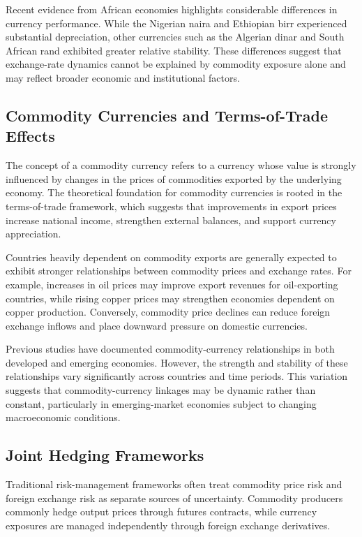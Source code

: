 \documentclass{article}
\begin{document}
Recent evidence from African economies highlights considerable differences in currency performance. While the Nigerian naira and Ethiopian birr experienced substantial depreciation, other currencies such as the Algerian dinar and South African rand exhibited greater relative stability. These differences suggest that exchange-rate dynamics cannot be explained by commodity exposure alone and may reflect broader economic and institutional factors.

\subsection{Commodity Currencies and Terms-of-Trade Effects}

The concept of a commodity currency refers to a currency whose value is strongly influenced by changes in the prices of commodities exported by the underlying economy. The theoretical foundation for commodity currencies is rooted in the terms-of-trade framework, which suggests that improvements in export prices increase national income, strengthen external balances, and support currency appreciation.

Countries heavily dependent on commodity exports are generally expected to exhibit stronger relationships between commodity prices and exchange rates. For example, increases in oil prices may improve export revenues for oil-exporting countries, while rising copper prices may strengthen economies dependent on copper production. Conversely, commodity price declines can reduce foreign exchange inflows and place downward pressure on domestic currencies.

Previous studies have documented commodity-currency relationships in both developed and emerging economies. However, the strength and stability of these relationships vary significantly across countries and time periods. This variation suggests that commodity-currency linkages may be dynamic rather than constant, particularly in emerging-market economies subject to changing macroeconomic conditions.

\subsection{Joint Hedging Frameworks}

Traditional risk-management frameworks often treat commodity price risk and foreign exchange risk as separate sources of uncertainty. Commodity producers commonly hedge output prices through futures contracts, while currency exposures are managed independently through foreign exchange derivatives.
\end{document}
